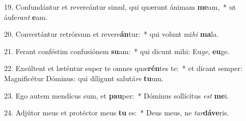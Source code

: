 19. Confundántur et revereántur simul, qui quærunt ánimam \textbf{me}am,~*  ut áufe\textit{rant} \textbf{e}am.\

20. Convertántur retrórsum et revere\textbf{án}tur:~*  qui volunt mi\textit{hi} \textbf{ma}la.\

21. Ferant conféstim confusiónem \textbf{su}am:~*  qui dicunt mihi: Eu\textit{ge}, \textbf{eu}ge.\

22. Exsúltent et læténtur super te omnes quæ\textbf{rén}tes te:~*  et dicant semper: Magnificétur Dóminus: qui díligunt salutá\textit{re} \textbf{tu}um.\

23. Ego autem mendícus sum, et \textbf{pau}per:~*  Dóminus sollícitus \textit{est} \textbf{me}i.\

24. Adjútor meus et protéctor meus \textbf{tu} es:~*  Deus meus, ne \textit{tar}\textbf{dá}\textbf{ve}ris.\


